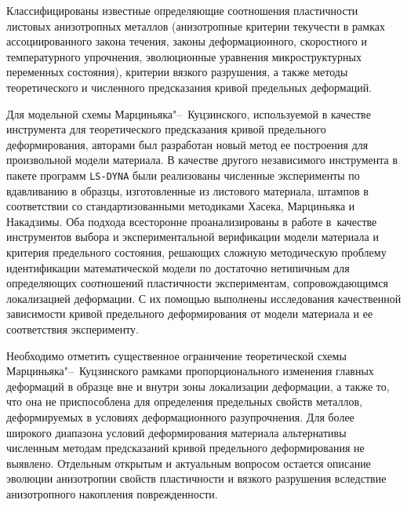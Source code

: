 Классифицированы известные определяющие соотношения пластичности листовых анизотропных металлов (анизотропные критерии текучести в рамках ассоциированного закона течения, законы деформационного, скоростного и температурного упрочнения, эволюционные уравнения микроструктурных переменных состояния), критерии вязкого разрушения, а также методы теоретического и численного предсказания кривой предельных деформаций. 



Для  модельной схемы Марциньяка"--~Куцзинского, используемой в качестве инструмента для теоретического предсказания кривой предельного деформирования, авторами был разработан новый метод ее построения для произвольной модели материала. В качестве другого независимого инструмента в пакете программ {\tt LS-DYNA} были реализованы численные эксперименты по вдавливанию в образцы, изготовленные из листового материала, штампов в соответствии со стандартизованными методиками Хасека,  Марциньяка и Накадзимы. Оба подхода всесторонне проанализированы в работе в~качестве инструментов выбора и экспериментальной верификации модели материала и критерия предельного состояния, решающих сложную методическую проблему идентификации математической модели по достаточно нетипичным для определяющих соотношений пластичности экспериментам, сопровождающимся локализацией деформации. С их помощью выполнены исследования качественной зависимости кривой предельного деформирования от модели материала и ее соответствия эксперименту.



Необходимо отметить существенное ограничение теоретической схемы \linebreak Марциньяка"--~Куцзинского рамками пропорционального изменения главных деформаций в образце вне и внутри зоны локализации деформации, а также то, что она не приспособлена для определения предельных свойств металлов, деформируемых в условиях деформационного разупрочнения. Для более широкого диапазона условий деформирования материала альтернативы численным методам предсказаний кривой предельного деформирования не выявлено. Отдельным открытым и актуальным вопросом остается описание эволюции анизотропии свойств пластичности и вязкого разрушения вследствие анизотропного накопления поврежденности.








